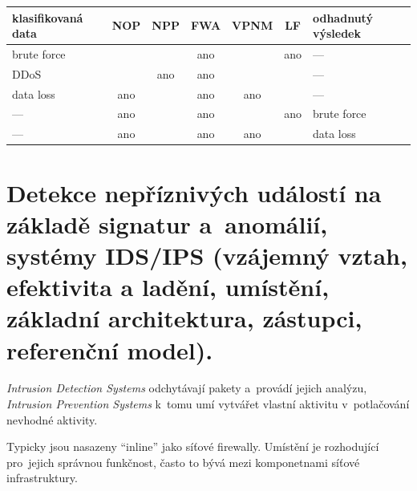 \begin{table}[ht]
    \centering
    \begin{tabular}{l|ccccc|l}
        \textbf{klasifikovaná data} & NOP & NPP & FWA & VPNM & LF  & \textbf{odhadnutý výsledek} \\
        \hline
        brute force                 &     &     & ano &      & ano & ---                         \\
        DDoS                        &     & ano & ano &      &     & ---                         \\
        data loss                   & ano &     & ano & ano  &     & ---                         \\
        \hline
        ---                         & ano &     & ano &      & ano & brute force                 \\
        ---                         & ano &     & ano & ano  &     & data loss                   \\
    \end{tabular}
\end{table}


\clearpage
\section{Detekce nepříznivých událostí na základě signatur a~anomálií, systémy IDS/IPS (vzájemný vztah, efektivita a ladění, umístění, základní architektura, zástupci, referenční model).}

\emph{Intrusion Detection Systems} odchytávají pakety a~provádí jejich analýzu, \emph{Intrusion Prevention Systems} k~tomu umí vytvářet vlastní aktivitu v~potlačování nevhodné aktivity.

Typicky jsou nasazeny \enquote{inline} jako síťové firewally. Umístění je rozhodující pro~jejich správnou funkčnost, často to bývá mezi komponetnami síťové infrastruktury.

